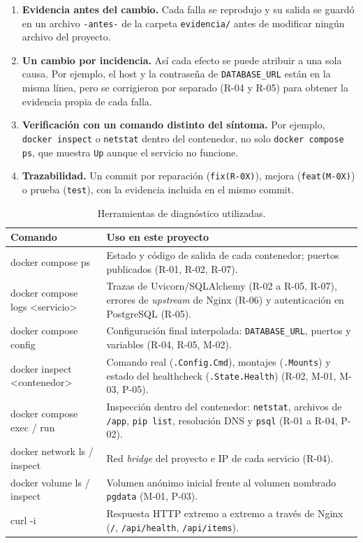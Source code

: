 \documentclass[11pt,a4paper]{article}
\newcommand{\cod}[1]{\texttt{#1}}
\begin{document}
\begin{enumerate}
  \item \textbf{Evidencia antes del cambio.} Cada falla se reprodujo y su salida se guardó en un archivo \cod{-antes-} de la carpeta \cod{evidencia/} antes de modificar ningún archivo del proyecto.
  \item \textbf{Un cambio por incidencia.} Así cada efecto se puede atribuir a una sola causa. Por ejemplo, el host y la contraseña de \cod{DATABASE\_URL} están en la misma línea, pero se corrigieron por separado (R-04 y R-05) para obtener la evidencia propia de cada falla.
  \item \textbf{Verificación con un comando distinto del síntoma.} Por ejemplo, \cod{docker inspect} o \cod{netstat} dentro del contenedor, no solo \cod{docker compose ps}, que muestra \cod{Up} aunque el servicio no funcione.
  \item \textbf{Trazabilidad.} Un commit por reparación (\cod{fix(R-0X)}), mejora (\cod{feat(M-0X)}) o prueba (\cod{test}), con la evidencia incluida en el mismo commit.
\end{enumerate}

\begin{table}[H]
\centering\small
\begin{tabularx}{\linewidth}{@{}>{\ttfamily\raggedright}p{5.6cm} X@{}}
\toprule
\normalfont\textbf{Comando} & \textbf{Uso en este proyecto} \\
\midrule
docker compose ps & Estado y código de salida de cada contenedor; puertos publicados (R-01, R-02, R-07). \\
docker compose logs <servicio> & Trazas de Uvicorn/SQLAlchemy (R-02 a R-05, R-07), errores de \emph{upstream} de Nginx (R-06) y autenticación en PostgreSQL (R-05). \\
docker compose config & Configuración final interpolada: \cod{DATABASE\_URL}, puertos y variables (R-04, R-05, M-02). \\
docker inspect <contenedor> & Comando real (\cod{.Config.Cmd}), montajes (\cod{.Mounts}) y estado del healthcheck (\cod{.State.Health}) (R-02, M-01, M-03, P-05). \\
docker compose exec / run & Inspección dentro del contenedor: \cod{netstat}, archivos de \cod{/app}, \cod{pip list}, resolución DNS y \cod{psql} (R-01 a R-04, P-02). \\
docker network ls / inspect & Red \emph{bridge} del proyecto e IP de cada servicio (R-04). \\
docker volume ls / inspect & Volumen anónimo inicial frente al volumen nombrado \cod{pgdata} (M-01, P-03). \\
curl -i & Respuesta HTTP extremo a extremo a través de Nginx (\cod{/}, \cod{/api/health}, \cod{/api/items}). \\
\bottomrule
\end{tabularx}
\caption{Herramientas de diagnóstico utilizadas.}
\end{table}
\end{document}
